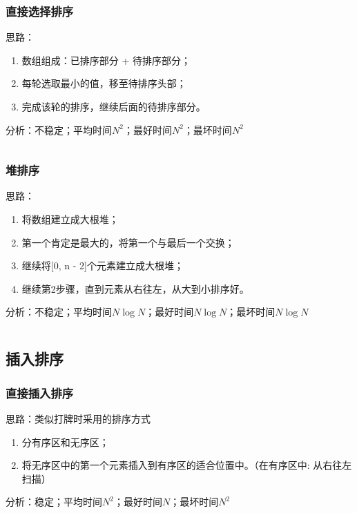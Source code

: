 \documentclass{article}
\begin{document}
    \subsubsection{直接选择排序}
    思路：
    \begin{enumerate}
      \item 数组组成：已排序部分 + 待排序部分；
      \item 每轮选取最小的值，移至待排序头部；
      \item 完成该轮的排序，继续后面的待排序部分。
    \end{enumerate}
    分析：不稳定；平均时间$N^2$；最好时间$N^2$；最坏时间$N^2$

    \inputminted{java}{src/chapter02/SelectionSort.java}

    \subsubsection{堆排序}
    思路：
    \begin{enumerate}
      \item 将数组建立成大根堆；
      \item 第一个肯定是最大的，将第一个与最后一个交换；
      \item 继续将[0, n - 2]个元素建立成大根堆；
      \item 继续第2步骤，直到元素从右往左，从大到小排序好。
    \end{enumerate}
    分析：不稳定；平均时间$N \log N$；最好时间$N \log N$；最坏时间$N \log N$

    \inputminted{java}{src/chapter02/HeapSort.java}

  \subsection{插入排序}
    \subsubsection{直接插入排序}
    思路：类似打牌时采用的排序方式
    \begin{enumerate}
      \item 分有序区和无序区；
      \item 将无序区中的第一个元素插入到有序区的适合位置中。（在有序区中: 从右往左扫描）
    \end{enumerate}
    分析：稳定；平均时间$N^2$；最好时间$N$；最坏时间$N^2$

    \inputminted{java}{src/chapter02/HeapSort.java}
\end{document}
